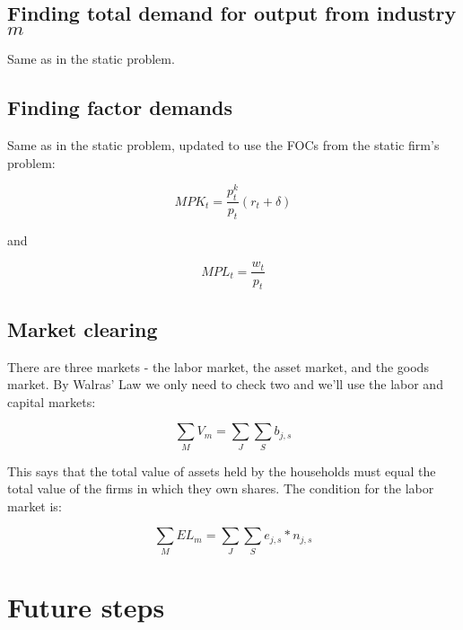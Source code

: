 \documentclass[letterpaper,12pt]{article}
\theoremstyle{definition}
\begin{document}
\begin{spacing}{1.5}
\subsection*{Finding total demand for output from industry $m$}

Same as in the static problem.

\subsection*{Finding factor demands}

Same as in the static problem, updated to use the FOCs from the static firm's problem:

\begin{equation}
MPK_{t} = \frac{p^{k}_{t}}{p_{t}}(r_{t}+\delta)
\end{equation}

and

\begin{equation}
MPL_{t} = \frac{w_{t}}{p_{t}}
\end{equation}

\subsection*{Market clearing}

There are three markets - the labor market, the asset market, and the goods market.  By Walras' Law we only need to check two and we'll use the labor and capital markets:

\begin{equation}
\sum_{M} V_{m} = \sum_{J}\sum_{S}b_{j,s}
\end{equation}

\noindent\noindent This says that the total value of assets held by the households must equal the total value of the firms in which they own shares. The condition for the labor market is: 

\begin{equation}
\sum_{M} EL_{m} = \sum_{J}\sum_{S}e_{j,s}*n_{j,s}
\end{equation}


\section*{Future steps}


\end{spacing}
\end{document}
